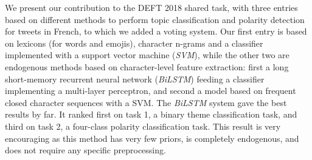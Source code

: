 
We present our contribution to the DEFT 2018 shared task, with three entries based on different methods to perform topic classification and polarity detection for tweets in French, to which we added a voting system.
Our first entry is based on lexicons (for words and emojis), character n-grams and a classifier implemented with a support vector machine (\textit{SVM}), while the other two are endogenous methods based on character-level feature extraction: first a long short-memory recurrent neural network (\textit{BiLSTM}) feeding a classifier implementing a multi-layer perceptron, and second a model based on frequent closed character sequences with a {SVM}.
The \textit{BiLSTM} system gave the best results by far.
It ranked first on task 1, a binary theme classification task, and third on task 2, a four-class polarity classification task.
This result is very encouraging as this method has very few priors, is completely endogenous, and does not require any specific preprocessing.


